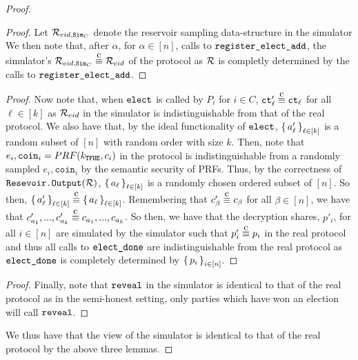 \begin{theorem}
\begin{proof}
\begin{lemma}
\begin{proof}
				Let $\mathcal{R}_{{eid}, \texttt{Sim}_C}$ denote the reservoir sampling data-structure in the simulator
				We then note that, after $\alpha$, for $\alpha \in [n]$,  calls to $\texttt{register\_elect\_add}$, the simulator's $\resSampling_{\eid, \simCMSLE} \compInd \resSampling_\eid$
				of the protocol as $\mathcal{R}$ is completly determined by the calls to $\texttt{register\_elect\_add}$.
			\end{proof}
		\end{lemma}
		\begin{lemma}
			\begin{proof}
				Now note that, when $\texttt{elect}$ is called by $P_i$ for $i \in C$, $\ct'_\ell \compInd \ct_\ell$ for all $\ell \in [k]$
				as $\mathcal{R}_{eid}$ in the simulator is indistinguishable from that of the real protocol.
				We also have that, by the ideal functionality of $\texttt{elect}$, $\set{a'_\ell}_{\ell \in [k]}$ is a random subset of $[n]$ with random order with size $k$.
				Then, note that $e_i, \texttt{coin}_i = PRF(k_{\texttt{TFHE}}, c_i)$ in the protocol is indistinguishable from a randomly sampled $e_i, \texttt{coin}_i$
				by the semantic security of PRFs. Thus, by the correctness of $\texttt{Resevoir.Output}(\mathcal{R})$, $\set{a_\ell}_{\ell \in [k]}$ is a randomly chosen ordered subset of $[n]$.
				So then, $\set{a'_\ell}_{\ell \in [k]} \compInd \set{a_\ell}_{\ell \in [k]}$.
				Remembering that $c'_\beta \compInd c_\beta$ for all $\beta \in [n]$, we have that $c'_{a_1}, ..., c'_{a_k} \compInd c_{a_1}, ..., c_{a_k}$.
				So then, we have that the decryption shares, $p'_i$, for all $i \in [n]$ are simulated by the simulator such that $p'_i \compInd p_i$ in the real protocol
				and thus all calls to $\texttt{elect\_done}$ are indistinguishable from the real protocol as $\texttt{elect\_done}$ is completely
				determined by $\set{p_i}_{i \in [n]}$.

			\end{proof}
		\end{lemma}
		\begin{lemma}
			\begin{proof}
			Finally, note that $\texttt{reveal}$ in the simulator is identical to that of the real protocol
			as in the semi-honest setting, only parties which have won an election will call $\texttt{reveal}$.
			\end{proof}
		\end{lemma}
		We thus have that the view of the simulator is identical to that of the real protocol by the above three lemmas.
	\end{proof}
\end{theorem}


